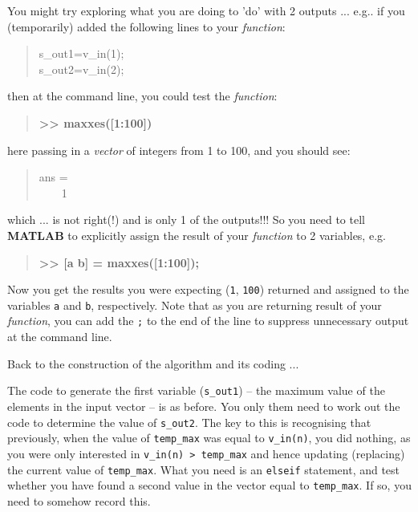 \documentclass{tufte-book} %
\newenvironment{docspec}{\begin{quotation}\ttfamily\parskip0pt\parindent0pt\ignorespaces}{\end{quotation}}
\newenvironment{docspecbold}{\begin{quotation}\ttfamily\bfseries\parskip0pt\parindent0pt\ignorespaces}{\end{quotation}}
\begin{document}
You might try exploring what you are doing to 'do' with 2 outputs ... e.g.. if you (temporarily) added the following lines to your \textit{function}:
\vspace{-1mm}
\begin{docspec}
s\_out1=v\_in(1);\\
s\_out2=v\_in(2);
\end{docspec}
\vspace{-1mm}
then at the command line, you could test the \textit{function}:
\vspace{-1mm}
\begin{docspecbold}
>> maxxes([1:100])
\end{docspecbold}
\vspace{-1mm}
here passing in a \textit{vector} of integers from 1 to 100, and you should see:
\vspace{-1mm}
\begin{docspec}
ans =\\
\ \ \ \ 1
\end{docspec}
\vspace{-1mm}
which ... is not right(!) and is only 1 of the outputs!!! So you need to tell \textbf{MATLAB} to explicitly assign the result of your \textit{function} to 2 variables, e.g.
\vspace{-1mm}
\begin{docspecbold}
>> [a b] = maxxes([1:100]);
\end{docspecbold}
\vspace{-1mm}
Now you get the results you were expecting (\texttt{1}, \texttt{100}) returned and assigned to the variables \texttt{a} and \texttt{b}, respectively. Note that as you are returning result of your \textit{function}, you can add the \texttt{;} to the end of the line to suppress unnecessary output at the command line.

Back to the construction of the algorithm and its coding ...

The code to generate the first variable (\texttt{s\_out1}) -- the maximum value of the elements in the input vector -- is as before. You only them need to work out the code to determine the value of \texttt{s\_out2}. The key to this is recognising that previously, when the value of \texttt{temp\_max} was equal to \texttt{v\_in(n)}, you did nothing, as you were only interested in \texttt{v\_in(n) > temp\_max} and hence updating (replacing) the current value of \texttt{temp\_max}. What you need is an \texttt{elseif} statement, and test whether you have found a second value in the vector equal to \texttt{temp\_max}. If so, you need to somehow record this.
\end{document}
